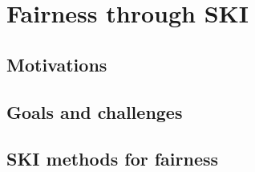 
\chapter[Fairness through SKI]{Fairness through \gls{SKI}}
\label{ch:fairness-through-ski}
\minitoc

\section{Motivations}\label{sec:fairness-motivations}

\section{Goals and challenges}\label{sec:fairness-goals-and-challenges}

\section[SKI methods for fairness]{\Gls{SKI} methods for fairness}\label{sec:ski-for-fairness}
